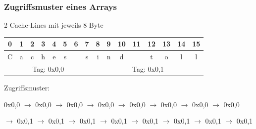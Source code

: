 \documentclass[xcolor=pdftex,dvipsnames,table]{beamer}
\begin{document}
\begin{frame}
	\frametitle{Zugriffsmuster eines Arrays}
			2 Cache-Lines mit jeweils 8 Byte\\
			\begin{tabular}{|c|c|c|c|c|c|c|c|c|c|c|c|c|c|c|c|}
				\hline
				0 & 1 & 2 & 3 & 4 & 5 & 6 & 7 & 8 & 9 & 10 & 11 & 12 & 13 & 14 & 15 \\
				\hline
				C & a & c & h & e & s & \  & s & i & n & d & \  & t & o & l & l \\
				\hline
				\multicolumn{8}{|c|}{Tag: 0x0,0} &
				\multicolumn{8}{c|}{Tag: 0x0,1} \\
				\hline
			\end{tabular}
			\begin{block}{Zugriffsmuster:}
			\small{
			0x0,0 $\rightarrow$ 0x0,0 $\rightarrow$ 0x0,0 $\rightarrow$ 0x0,0 $\rightarrow$ 0x0,0 $\rightarrow$ 0x0,0 $\rightarrow$ 0x0,0 $\rightarrow$ 0x0,0
			
			 $\rightarrow$ 0x0,1 $\rightarrow$ 0x0,1 $\rightarrow$ 0x0,1 $\rightarrow$ 0x0,1 $\rightarrow$ 0x0,1 $\rightarrow$ 0x0,1 $\rightarrow$ 0x0,1 $\rightarrow$ 0x0,1
			}
			\end{block}
\end{frame}
\end{document}

